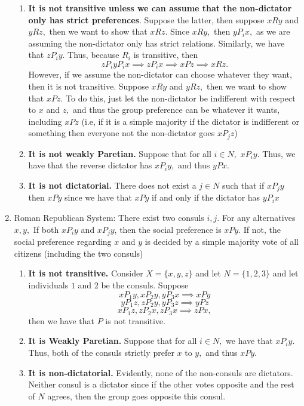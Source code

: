 \documentclass[11pt]{article}
\begin{document}
\begin{enumerate}
\begin{solution}
        \begin{enumerate}
            \item \textbf{It is not transitive unless we can assume that the non-dictator only has strict preferences}. Suppose the latter, then suppose $xRy$ and $yRz,$ then we want to show that $xRz.$ Since $xRy,$ then $yP_ix,$ as we are assuming the non-dictator only has strict relations. Similarly, we have that $zP_iy.$ Thus, because $R_i$ is transitive, then 
            \[zP_iyP_ix \implies zP_ix \implies xPz \implies xRz.\]
            However, if we assume the non-dictator can choose whatever they want, then it is not transitive. Suppose $xRy$ and $yRz,$ then we want to show that $xPz.$ To do this, just let the non-dictator be indifferent with respect to $x$ and $z,$ and thus the group preference can be whatever it wants, including $xPz$ (i.e, if it is a simple majority if the dictator is indifferent or something then everyone not the non-dictator goes $xP_jz$)
            \item \textbf{It is not weakly Paretian.} Suppose that for all $i \in N,$ $xP_iy.$ Thus, we have that the reverse dictator has $xP_iy,$ and thus $yPx.$ 
            \item \textbf{It is not dictatorial.} There does not exist a $j\in N$ such that if $xP_jy$ then $xPy$ since we have that $xPy$ if and only if the dictator has $yP_ix$ 
        \end{enumerate}
    \end{solution}
    \item 
    \begin{problem}
        Roman Republican System: There exist two consuls $i, j.$ For any alternatives $x, y,$ If both $xP_iy$ and $xP_jy$, then the social preference is $xPy$. If not, the social preference
regarding $x$ and $y$ is decided by a simple majority vote of all citizens (including the two consuls)
    \end{problem}
    \begin{solution}
        \begin{enumerate}
            \item \textbf{It is not transitive.} Consider $X = \{x,y,z\}$ and let $N = \{1,2,3\}$ and let individuals $1$ and $2$ be the consuls. Suppose
            \[xP_1y, xP_2y, yP_3x \implies xPy\]
            \[yP_1z, zP_2y, yP_3z \implies yPz\]
            \[xP_1z, zP_2x, zP_3x \implies zPx,\] then we have that $P$ is not transitive.
            \item \textbf{It is Weakly Paretian.} Suppose that for all $i\in N,$ we have that $xP_iy.$ Thus, both of the consuls strictly prefer $x$ to $y,$ and thus $xPy.$
            \item \textbf{It is non-dictatorial.} Evidently, none of the non-consuls are dictators. Neither consul is a dictator since if the other votes opposite and the rest of $N$ agrees, then the group goes opposite this consul.
        \end{enumerate}
    \end{solution}
\end{enumerate}
\end{document}
